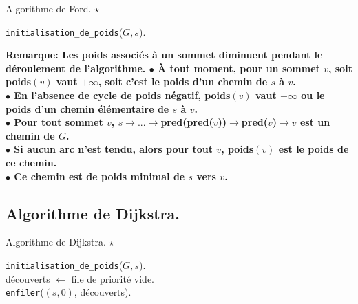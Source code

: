 \documentclass[french, 11pt]{article}
\begin{document}
\begin{defi}{Algorithme de Ford. $\star$}{}
    \begin{algorithm}[H]
        \LinesNumbered
        \caption{Algorithme de Ford.}
        \texttt{initialisation\_de\_poids}($G,s$).\\
    \end{algorithm}
    \bf{Remarque:} Les poids associés à un sommet diminuent pendant le déroulement de l'algorithme.\n
    $\bullet$ À tout moment, pour un sommet $v$, soit poids$(v)$ vaut $+\infty$, soit c'est le poids d'un chemin de $s$ à $v$.\\
    $\bullet$ En l'absence de cycle de poids négatif, poids$(v)$ vaut $+\infty$ ou le poids d'un chemin élémentaire de $s$ à $v$.\\
    $\bullet$ Pour tout sommet $v$, $s\to...\to$pred(pred($v$))$\to$pred($v$)$\to v$ est un chemin de $G$.\\
    $\bullet$ Si aucun arc n'est tendu, alors pour tout $v$, poids$(v)$ est le poids de ce chemin.\\
    $\bullet$ Ce chemin est de poids minimal de $s$ vers $v$.
\end{defi}

\subsection{Algorithme de Dijkstra.}

\begin{defi}{Algorithme de Dijkstra. $\star$}{}
    \begin{algorithm}[H]
        \LinesNumbered
        \caption{Algorithme de Dijkstra.}
        \texttt{initialisation\_de\_poids}($G,s$).\\
        découverts $\gets$ file de priorité vide.\\
        \texttt{enfiler}($(s,0)$, découverts).\\
    \end{algorithm}
\end{defi}
\end{document}
